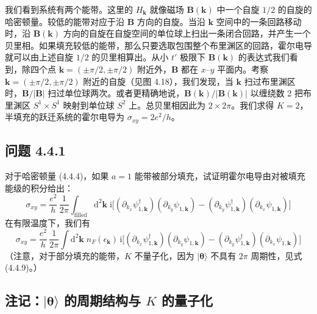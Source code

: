 我们看到系统有两个能带。这里的 $H_{\pmb{k}}$ 就像磁场 $\pmb{B}(\pmb{k})$ 中一个自旋 $1/2$ 的自旋的哈密顿量。较低的能带对应于沿 $\pmb{B}$ 方向的自旋。当沿 $\pmb{k}$ 空间中的一条回路移动时，沿 $\pmb{B}(\pmb{k})$ 方向的自旋在自旋空间的单位球上扫出一条闭合回路，并产生一个贝里相。如果填充较低的能带，那么只要选取包围整个布里渊区的回路，霍尔电导就可以由上述自旋 $1/2$ 的贝里相算出。从小 $t'$ 极限下 $\pmb{B}(\pmb{k})$ 的表达式我们看到，除四个点 $\pmb{k} = (\pm\pi/2, \pm\pi/2)$ 附近外，$\pmb{B}$ 都在 $x$--$y$ 平面内。考察 $\pmb{k} = (\pm\pi/2, \pm\pi/2)$ 附近的自旋（见图 4.18），我们发现，当 $\pmb{k}$ 扫过布里渊区时，$\pmb{B}/|\pmb{B}|$ 扫过单位球两次。或者更精确地说，$\pmb{B}(\pmb{k})/|\pmb{B}(\pmb{k})|$ 以缠绕数 2 把布里渊区 $S^{1} \times S^{1}$ 映射到单位球 $S^{2}$ 上。总贝里相因此为 $2 \times 2\pi$。我们求得 $K = 2$，半填充的跃迁系统的霍尔电导为 $\sigma_{xy} = 2e^{2}/h$。

\subsection*{问题 4.4.1}

对于哈密顿量 (4.4.4)，如果 $a = 1$ 能带被部分填充，试证明霍尔电导由对被填充能级的积分给出：
\begin{equation*}
\sigma_{xy} = \frac{e^{2}}{h}\, \frac{1}{2\pi} \int_{\text{filled}} \mathrm{d}^{2}\pmb{k}\; \mathrm{i} \big[ (\partial_{k_{x}} \psi_{1,\pmb{k}}^{\dagger}) (\partial_{k_{y}} \psi_{1,\pmb{k}}) - (\partial_{k_{y}} \psi_{1,\pmb{k}}^{\dagger}) (\partial_{k_{x}} \psi_{1,\pmb{k}}) \big]
\end{equation*}
在有限温度下，我们有
\begin{equation*}
\sigma_{xy} = \frac{e^{2}}{h}\, \frac{1}{2\pi} \int \mathrm{d}^{2}\pmb{k}\; n_{F}(\epsilon_{\pmb{k}})\, \mathrm{i} \big[ (\partial_{k_{x}} \psi_{1,\pmb{k}}^{\dagger}) (\partial_{k_{y}} \psi_{1,\pmb{k}}) - (\partial_{k_{y}} \psi_{1,\pmb{k}}^{\dagger}) (\partial_{k_{x}} \psi_{1,\pmb{k}}) \big]
\end{equation*}
（注意，对于部分填充的能带，$K$ 不量子化，因为 $|\pmb{\theta}\rangle$ 不具有 $2\pi$ 周期性，见式 (4.4.9)。）

\subsection{注记：$|\pmb{\theta}\rangle$ 的周期结构与 $K$ 的量子化}

